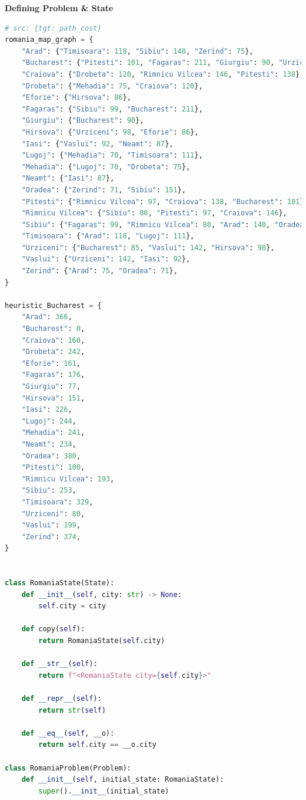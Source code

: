 \vspace{0.5cm}

{\centering \textbf{Defining Problem \& State} \par}

\begin{lstlisting}[language=Python]
# src: {tgt: path_cost}
romania_map_graph = {
    "Arad": {"Timisoara": 118, "Sibiu": 140, "Zerind": 75},
    "Bucharest": {"Pitesti": 101, "Fagaras": 211, "Giurgiu": 90, "Urziceni": 85},
    "Craiova": {"Drobeta": 120, "Rimnicu Vilcea": 146, "Pitesti": 138},
    "Drobeta": {"Mehadia": 75, "Craiova": 120},
    "Eforie": {"Hirsova": 86},
    "Fagaras": {"Sibiu": 99, "Bucharest": 211},
    "Giurgiu": {"Bucharest": 90},
    "Hirsova": {"Urziceni": 98, "Eforie": 86},
    "Iasi": {"Vaslui": 92, "Neamt": 87},
    "Lugoj": {"Mehadia": 70, "Timisoara": 111},
    "Mehadia": {"Lugoj": 70, "Drobeta": 75},
    "Neamt": {"Iasi": 87},
    "Oradea": {"Zerind": 71, "Sibiu": 151},
    "Pitesti": {"Rimnicu Vilcea": 97, "Craiova": 138, "Bucharest": 101},
    "Rimnicu Vilcea": {"Sibiu": 80, "Pitesti": 97, "Craiova": 146},
    "Sibiu": {"Fagaras": 99, "Rimnicu Vilcea": 80, "Arad": 140, "Oradea": 151},
    "Timisoara": {"Arad": 118, "Lugoj": 111},
    "Urziceni": {"Bucharest": 85, "Vaslui": 142, "Hirsova": 98},
    "Vaslui": {"Urziceni": 142, "Iasi": 92},
    "Zerind": {"Arad": 75, "Oradea": 71},
}

heuristic_Bucharest = {
    "Arad": 366,
    "Bucharest": 0,
    "Craiova": 160,
    "Drobeta": 242,
    "Eforie": 161,
    "Fagaras": 176,
    "Giurgiu": 77,
    "Hirsova": 151,
    "Iasi": 226,
    "Lugoj": 244,
    "Mehadia": 241,
    "Neamt": 234,
    "Oradea": 380,
    "Pitesti": 100,
    "Rimnicu Vilcea": 193,
    "Sibiu": 253,
    "Timisoara": 329,
    "Urziceni": 80,
    "Vaslui": 199,
    "Zerind": 374,
}


class RomaniaState(State):
    def __init__(self, city: str) -> None:
        self.city = city

    def copy(self):
        return RomaniaState(self.city)
    
    def __str__(self):
        return f"<RomaniaState city={self.city}>"

    def __repr__(self):
        return str(self)
    
    def __eq__(self, __o):
        return self.city == __o.city

class RomaniaProblem(Problem):
    def __init__(self, initial_state: RomaniaState):
        super().__init__(initial_state)
    

\end{lstlisting}
